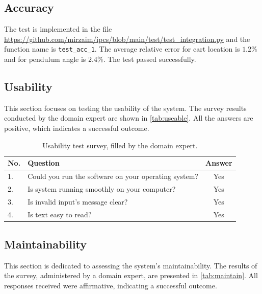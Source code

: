 \documentclass[12pt, titlepage]{article}
\begin{document}
\subsection{Accuracy}
The test is implemented in the file
\url{https://github.com/mirzaim/ipcs/blob/main/test/test_integration.py}
and the function name is \texttt{test\_acc\_1}.
The average relative error for cart location is $1.2\%$ and for pendulum angle is $2.4\%$.
The test passed successfully.

\subsection{Usability}
This section focuses on testing the usability of the system. 
The survey results conducted by the domain expert are shown in \autoref{tab:useable}.
All the answers are positive, which indicates a successful outcome.

\begin{table}[!h]
  \centering
  \caption{Usability test survey, filled by the domain expert.}
  \label{tab:useable}
  \begin{tabular}{ p{0.5cm}|p{10cm}|c}
    \hline
    No. & Question                                             & Answer \\
    \hline
    1.  & Could you run the software on your operating system? & Yes    \\
    2.  & Is system running smoothly on your computer?         & Yes    \\
    3.  & Is invalid input's message clear?                    & Yes    \\
    4.  & Is text easy to read?                                & Yes    \\
    \hline
  \end{tabular}
\end{table}

\subsection{Maintainability}
This section is dedicated to assessing the system's maintainability. 
The results of the survey, administered by a domain expert, 
are presented in \autoref{tab:maintain}. All responses received were affirmative, 
indicating a successful outcome.
\end{document}
